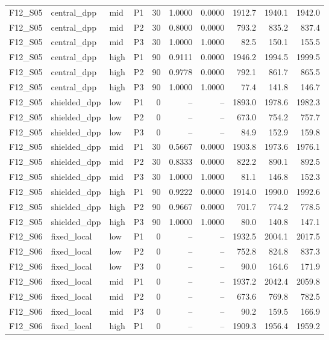 \begin{longtable}{llllrrrrrr}
F12\_S05 & central\_dpp & mid & P1 & 30 & 1.0000 & 0.0000 & 1912.7 & 1940.1 & 1942.0 \\
F12\_S05 & central\_dpp & mid & P2 & 30 & 0.8000 & 0.0000 & 793.2 & 835.2 & 837.4 \\
F12\_S05 & central\_dpp & mid & P3 & 30 & 1.0000 & 1.0000 & 82.5 & 150.1 & 155.5 \\
F12\_S05 & central\_dpp & high & P1 & 90 & 0.9111 & 0.0000 & 1946.2 & 1994.5 & 1999.5 \\
F12\_S05 & central\_dpp & high & P2 & 90 & 0.9778 & 0.0000 & 792.1 & 861.7 & 865.5 \\
F12\_S05 & central\_dpp & high & P3 & 90 & 1.0000 & 1.0000 & 77.4 & 141.8 & 146.7 \\
F12\_S05 & shielded\_dpp & low & P1 & 0 & -- & -- & 1893.0 & 1978.6 & 1982.3 \\
F12\_S05 & shielded\_dpp & low & P2 & 0 & -- & -- & 673.0 & 754.2 & 757.7 \\
F12\_S05 & shielded\_dpp & low & P3 & 0 & -- & -- & 84.9 & 152.9 & 159.8 \\
F12\_S05 & shielded\_dpp & mid & P1 & 30 & 0.5667 & 0.0000 & 1903.8 & 1973.6 & 1976.1 \\
F12\_S05 & shielded\_dpp & mid & P2 & 30 & 0.8333 & 0.0000 & 822.2 & 890.1 & 892.5 \\
F12\_S05 & shielded\_dpp & mid & P3 & 30 & 1.0000 & 1.0000 & 81.1 & 146.8 & 152.3 \\
F12\_S05 & shielded\_dpp & high & P1 & 90 & 0.9222 & 0.0000 & 1914.0 & 1990.0 & 1992.6 \\
F12\_S05 & shielded\_dpp & high & P2 & 90 & 0.9667 & 0.0000 & 701.7 & 774.2 & 778.5 \\
F12\_S05 & shielded\_dpp & high & P3 & 90 & 1.0000 & 1.0000 & 80.0 & 140.8 & 147.1 \\
F12\_S06 & fixed\_local & low & P1 & 0 & -- & -- & 1932.5 & 2004.1 & 2017.5 \\
F12\_S06 & fixed\_local & low & P2 & 0 & -- & -- & 752.8 & 824.8 & 837.3 \\
F12\_S06 & fixed\_local & low & P3 & 0 & -- & -- & 90.0 & 164.6 & 171.9 \\
F12\_S06 & fixed\_local & mid & P1 & 0 & -- & -- & 1937.2 & 2042.4 & 2059.8 \\
F12\_S06 & fixed\_local & mid & P2 & 0 & -- & -- & 673.6 & 769.8 & 782.5 \\
F12\_S06 & fixed\_local & mid & P3 & 0 & -- & -- & 90.2 & 159.5 & 166.9 \\
F12\_S06 & fixed\_local & high & P1 & 0 & -- & -- & 1909.3 & 1956.4 & 1959.2 \\

\end{longtable}

